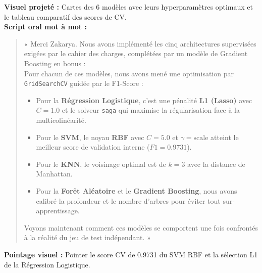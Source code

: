 \documentclass[a4paper,11pt]{article}
\begin{document}
\begin{tcolorbox}[speechbox, title={Slide 6 : Algorithmes Supervisés \& Recherche d'Hyperparamètres (04:30 -- 05:35)}]
	\textbf{Visuel projeté :} Cartes des 6 modèles avec leurs hyperparamètres optimaux et le tableau comparatif des scores de CV.\\
	\textbf{Script oral mot à mot :}
	\begin{quote}
		« Merci Zakarya. Nous avons implémenté les cinq architectures supervisées exigées par le cahier des charges, complétées par un modèle de Gradient Boosting en bonus :\\
		Pour chacun de ces modèles, nous avons mené une optimisation par \texttt{GridSearchCV} guidée par le F1-Score :
		\begin{itemize}[leftmargin=0.5cm, itemsep=1pt]
			\item Pour la \textbf{Régression Logistique}, c'est une pénalité \textbf{L1 (Lasso)} avec $C=1.0$ et le solveur \texttt{saga} qui maximise la régularisation face à la multicolinéarité.
			\item Pour le \textbf{SVM}, le noyau \textbf{RBF} avec $C=5.0$ et $\gamma=\text{scale}$ atteint le meilleur score de validation interne ($F1 = 0.9731$).
			\item Pour le \textbf{KNN}, le voisinage optimal est de $k=3$ avec la distance de Manhattan.
			\item Pour la \textbf{Forêt Aléatoire} et le \textbf{Gradient Boosting}, nous avons calibré la profondeur et le nombre d'arbres pour éviter tout sur-apprentissage.
		\end{itemize}
		Voyons maintenant comment ces modèles se comportent une fois confrontés à la réalité du jeu de test indépendant. »
	\end{quote}
	\textbf{Pointage visuel :} Pointer le score CV de 0.9731 du SVM RBF et la sélection L1 de la Régression Logistique.
\end{tcolorbox}
\end{document}
